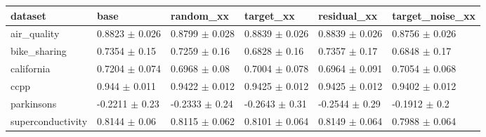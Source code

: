 \begin{tabular}{llllll}
\toprule
dataset & base & random\_xx & target\_xx & residual\_xx & target\_noise\_xx \\
\midrule
air\_quality & 0.8823 $\pm$ 0.026 & 0.8799 $\pm$ 0.028 & 0.8839 $\pm$ 0.026 & 0.8839 $\pm$ 0.026 & 0.8756 $\pm$ 0.026 \\
bike\_sharing & 0.7354 $\pm$ 0.15 & 0.7259 $\pm$ 0.16 & 0.6828 $\pm$ 0.16 & 0.7357 $\pm$ 0.17 & 0.6848 $\pm$ 0.17 \\
california & 0.7204 $\pm$ 0.074 & 0.6968 $\pm$ 0.08 & 0.7004 $\pm$ 0.078 & 0.6964 $\pm$ 0.091 & 0.7054 $\pm$ 0.068 \\
ccpp & 0.944 $\pm$ 0.011 & 0.9422 $\pm$ 0.012 & 0.9425 $\pm$ 0.012 & 0.9425 $\pm$ 0.012 & 0.9402 $\pm$ 0.012 \\
parkinsons & -0.2211 $\pm$ 0.23 & -0.2333 $\pm$ 0.24 & -0.2643 $\pm$ 0.31 & -0.2544 $\pm$ 0.29 & -0.1912 $\pm$ 0.2 \\
superconductivity & 0.8144 $\pm$ 0.06 & 0.8115 $\pm$ 0.062 & 0.8101 $\pm$ 0.064 & 0.8149 $\pm$ 0.064 & 0.7988 $\pm$ 0.064 \\
\bottomrule
\end{tabular}
